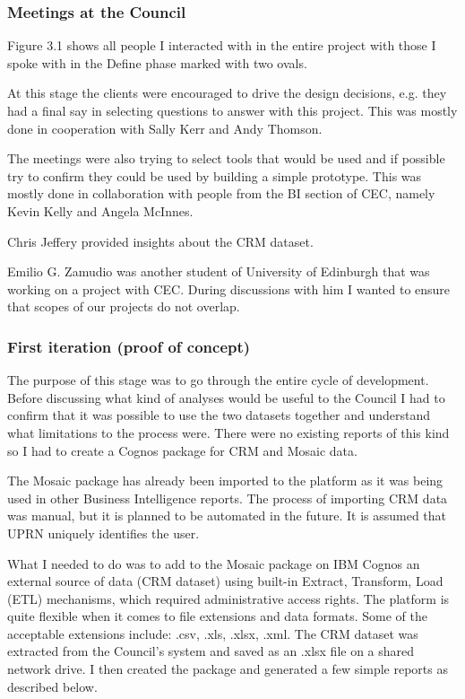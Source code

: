 			\subsubsection{Meetings at the Council}
			
Figure 3.1 shows all people I interacted with in the entire project with those I spoke with in the Define phase marked with two ovals.

At this stage the clients were encouraged to drive the design decisions, e.g. they had a final say in selecting questions to answer with this project. This was mostly done in cooperation with Sally Kerr and Andy Thomson.

The meetings were also trying to select tools that would be used and if possible try to confirm they could be used by building a simple prototype. This was mostly done in collaboration with people from the BI section of CEC, namely Kevin Kelly and Angela McInnes.

Chris Jeffery provided insights about the CRM dataset.

Emilio G. Zamudio was another student of University of Edinburgh that was working on a project with CEC. During discussions with him I wanted to ensure that scopes of our projects do not overlap.
			\subsubsection{First iteration (proof of concept)}
			
The purpose of this stage was to go through the entire cycle of development. Before discussing what kind of analyses would be useful to the Council I had to confirm that it was possible to use the two datasets together and understand what limitations to the process were. There were no existing reports of this kind so I had to create a Cognos package for CRM and Mosaic data.

The Mosaic package has already been imported to the platform as it was being used in other Business Intelligence reports. The process of importing CRM data was manual, but it is planned to be automated in the future. It is assumed that UPRN uniquely identifies the user.

What I needed to do was to add to the Mosaic package on IBM Cognos an external source of data (CRM dataset) using built-in Extract, Transform, Load (ETL) mechanisms, which required administrative access rights. The platform is quite flexible when it comes to file extensions and data formats. Some of the acceptable extensions include: .csv, .xls, .xlsx, .xml. The CRM dataset was extracted from the Council's system and saved as an .xlsx file on a shared network drive. I then created the package and generated a few simple reports as described below.

